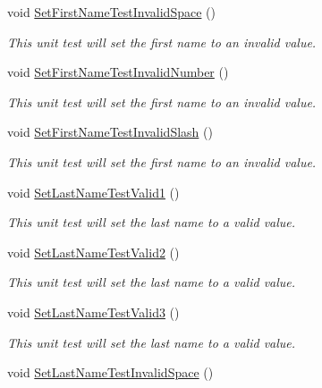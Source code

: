 \begin{DoxyCompactItemize}
void \hyperlink{class_my_all_employee_1_1_tests_1_1_employee_tests_acf02476171850b945471ac3b53c73ef3}{Set\+First\+Name\+Test\+Invalid\+Space} ()
\begin{DoxyCompactList}\small\item\em This unit test will set the first name to an invalid value. \end{DoxyCompactList}\item 
void \hyperlink{class_my_all_employee_1_1_tests_1_1_employee_tests_a12e807fb2fd6888b20572f246c692651}{Set\+First\+Name\+Test\+Invalid\+Number} ()
\begin{DoxyCompactList}\small\item\em This unit test will set the first name to an invalid value. \end{DoxyCompactList}\item 
void \hyperlink{class_my_all_employee_1_1_tests_1_1_employee_tests_ab18a4774eeb60fff1f2ab3ef420e0f9a}{Set\+First\+Name\+Test\+Invalid\+Slash} ()
\begin{DoxyCompactList}\small\item\em This unit test will set the first name to an invalid value. \end{DoxyCompactList}\item 
void \hyperlink{class_my_all_employee_1_1_tests_1_1_employee_tests_a382b99f0206a268573ba0533c6ed0f68}{Set\+Last\+Name\+Test\+Valid1} ()
\begin{DoxyCompactList}\small\item\em This unit test will set the last name to a valid value. \end{DoxyCompactList}\item 
void \hyperlink{class_my_all_employee_1_1_tests_1_1_employee_tests_a45e549be691bb05aac84850f00265482}{Set\+Last\+Name\+Test\+Valid2} ()
\begin{DoxyCompactList}\small\item\em This unit test will set the last name to a valid value. \end{DoxyCompactList}\item 
void \hyperlink{class_my_all_employee_1_1_tests_1_1_employee_tests_a112321d5dc92bc7d995625c94e0bb376}{Set\+Last\+Name\+Test\+Valid3} ()
\begin{DoxyCompactList}\small\item\em This unit test will set the last name to a valid value. \end{DoxyCompactList}\item 
void \hyperlink{class_my_all_employee_1_1_tests_1_1_employee_tests_a958f22718abef1aef9a6579c6a6b6f53}{Set\+Last\+Name\+Test\+Invalid\+Space} ()

\end{DoxyCompactItemize}
